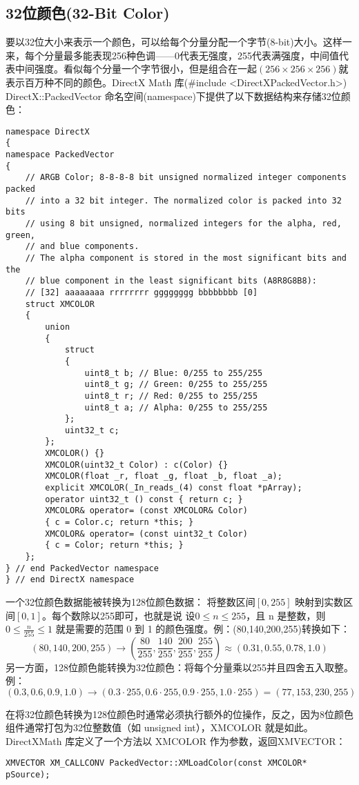 \subsection{32位颜色(32-Bit Color)}
\begin{flushleft}
要以32位大小来表示一个颜色，可以给每个分量分配一个字节(8-bit)大小。这样一来，每个分量最多能表现256种色调——0代表无强度，255代表满强度，中间值代表中间强度。看似每个分量一个字节很小，但是组合在一起$(256 \times 256 \times 256)$就表示百万种不同的颜色。DirectX Math 库(\#include <DirectXPackedVector.h>) DirectX::PackedVector 命名空间(namespace)下提供了以下数据结构来存储32位颜色：
\begin{lstlisting}
namespace DirectX
{
namespace PackedVector
{
    // ARGB Color; 8-8-8-8 bit unsigned normalized integer components packed
    // into a 32 bit integer. The normalized color is packed into 32 bits
    // using 8 bit unsigned, normalized integers for the alpha, red, green,
    // and blue components.
    // The alpha component is stored in the most significant bits and the
    // blue component in the least significant bits (A8R8G8B8):
    // [32] aaaaaaaa rrrrrrrr gggggggg bbbbbbbb [0]
    struct XMCOLOR
    {
        union
        {
            struct
            {
                uint8_t b; // Blue: 0/255 to 255/255
                uint8_t g; // Green: 0/255 to 255/255
                uint8_t r; // Red: 0/255 to 255/255
                uint8_t a; // Alpha: 0/255 to 255/255
            };
            uint32_t c;
        };
        XMCOLOR() {}
        XMCOLOR(uint32_t Color) : c(Color) {}
        XMCOLOR(float _r, float _g, float _b, float _a);
        explicit XMCOLOR(_In_reads_(4) const float *pArray);
        operator uint32_t () const { return c; }
        XMCOLOR& operator= (const XMCOLOR& Color) 
        { c = Color.c; return *this; }
        XMCOLOR& operator= (const uint32_t Color) 
        { c = Color; return *this; }
    };
} // end PackedVector namespace
} // end DirectX namespace
\end{lstlisting}
一个32位颜色数据能被转换为128位颜色数据： 将整数区间$[0, 255]$ 映射到实数区间$[0, 1]$。每个数除以255即可，也就是说 设$0 \leq n \leq 255$，且 n 是整数，则 $0 \leq \frac{n}{255} \leq 1$ 就是需要的范围 0 到 1 的颜色强度。例：(80,140,200,255)转换如下：
$$ (80,140,200,255)\rightarrow (\frac{80}{255},\frac{140}{255},\frac{200}{255},\frac{255}{255}) \approx (0.31,0.55,0.78,1.0)$$
另一方面，128位颜色能转换为32位颜色：将每个分量乘以255并且四舍五入取整。例：
$$(0.3,0.6,0.9,1.0)\rightarrow (0.3\cdot 255,0.6\cdot 255,0.9\cdot 255,1.0\cdot 255)=(77,153,230,255)$$

在将32位颜色转换为128位颜色时通常必须执行额外的位操作，反之，因为8位颜色组件通常打包为32位整数值（如 unsigned int），XMCOLOR 就是如此。DirectXMath 库定义了一个方法以 XMCOLOR 作为参数，返回XMVECTOR：
\begin{lstlisting}
XMVECTOR XM_CALLCONV PackedVector::XMLoadColor(const XMCOLOR* pSource);
\end{lstlisting}
\end{flushleft}

